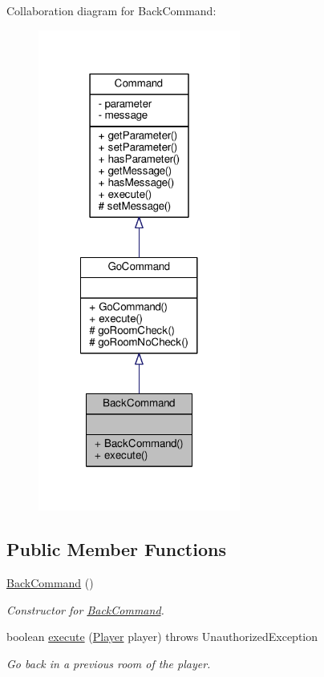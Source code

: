 Collaboration diagram for Back\-Command\-:
\nopagebreak
\begin{figure}[H]
\begin{center}
\leavevmode
\includegraphics[width=188pt]{classBackCommand__coll__graph}
\end{center}
\end{figure}
\subsection*{Public Member Functions}
\begin{DoxyCompactItemize}
\item 
\hyperlink{classBackCommand_a779456e24dfb281e5917e936da5fd901}{Back\-Command} ()
\begin{DoxyCompactList}\small\item\em Constructor for \hyperlink{classBackCommand}{Back\-Command}. \end{DoxyCompactList}\item 
boolean \hyperlink{classBackCommand_a1f5b1ecc435b3b03d9d1a880c31c9c7a}{execute} (\hyperlink{classPlayer}{Player} player)  throws Unauthorized\-Exception 
\begin{DoxyCompactList}\small\item\em Go back in a previous room of the player. \end{DoxyCompactList}\end{DoxyCompactItemize}
